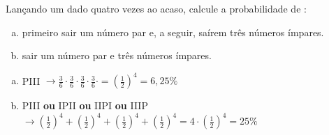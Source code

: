 \begin{ex}
Lançando um dado quatro vezes ao acaso, calcule a probabilidade de :
   \begin{enumerate}[(a)]
   \item primeiro sair um número par e, a seguir, saírem três números ímpares.
   \item sair um número par e três números ímpares.
   \end{enumerate}
     \begin{sol}
      \phantom{A} 
       \begin{enumerate} [(a)]
           \item PIII $\rightarrow \frac{3}{6}\cdot\frac{3}{6}\cdot\frac{3}{6}\cdot\frac{3}{6}\cdot=(\frac{1}{2})^4=6,25\%$
           \item PIII \textbf{ou} IPII \textbf{ou} IIPI \textbf{ou} IIIP 
          $\rightarrow(\frac{1}{2})^4+(\frac{1}{2})^4+(\frac{1}{2})^4+(\frac{1}{2})^4=4\cdot(\frac{1}{2})^4=25\%$
       \end{enumerate}
      
     \end{sol}
\end{ex}